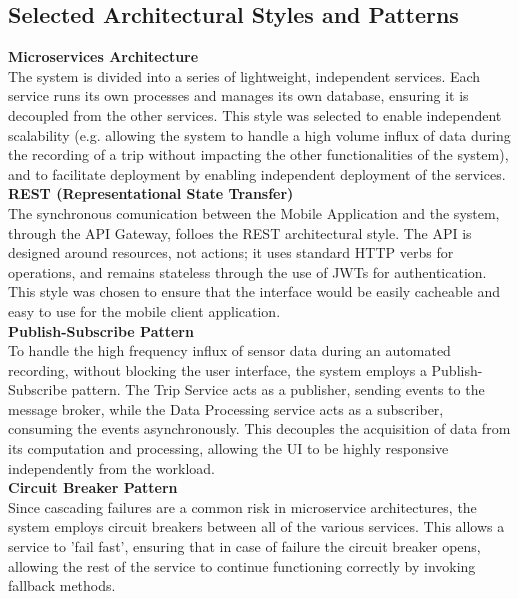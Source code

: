 \subsection{Selected Architectural Styles and Patterns}
\textbf{Microservices Architecture}\\
The system is divided into a series of lightweight, independent services. Each service 
runs its own processes and manages its own database, ensuring it is decoupled from the other 
services. This style was selected to enable independent scalability (e.g. allowing the system 
to handle a high volume influx of data during the recording of a trip without impacting the other 
functionalities of the system), and to facilitate deployment by enabling independent deployment of 
the services. \\
\newline
\textbf{REST (Representational State Transfer)}\\
The synchronous comunication between the Mobile Application and the system, through the API 
Gateway, folloes the REST architectural style. The API is designed around resources, not actions; it 
uses standard HTTP verbs for operations, and remains stateless through the use of JWTs for 
authentication. This style was chosen to ensure that the interface would be easily cacheable and 
easy to use for the mobile client application.\\
\newline
\textbf{Publish-Subscribe Pattern}\\
To handle the high frequency influx of sensor data during an automated recording, without
blocking the user interface, the system employs a Publish-Subscribe pattern. The Trip Service 
acts as a publisher, sending events to the message broker, while the Data Processing service 
acts as a subscriber, consuming the events asynchronously. This decouples the acquisition of 
data from its computation and processing, allowing the UI to be highly responsive independently from 
the workload.\\
\newline
\textbf{Circuit Breaker Pattern}\\
Since cascading failures are a common risk in microservice architectures, the system employs 
circuit breakers between all of the various services. This allows a service to 'fail fast', 
ensuring that in case of failure the circuit breaker opens, allowing the rest of the service to continue 
functioning correctly by invoking fallback methods.
